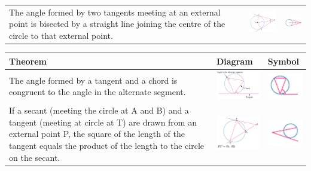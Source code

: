 \documentclass[a4paper,10pt]{report}
\begin{document}
\begin{center}
\begin{tabular}[center]{p{5cm}|p{3cm}|p{2cm}}
		The angle formed by two tangents meeting at an external point is bisected by a straight line joining the centre of the circle to that external point.                                          & \includegraphics[width=3cm]{circle theorem 10} & \includegraphics[width=2cm]{circle theorem 10 symbol} \\
	\end{tabular}
	\begin{tabular}[center]{p{5cm}|p{3cm}|p{2cm}}
		Theorem                                                                                                                                                                                                                      & Diagram                                        & Symbol                                                \\ \hline
		The angle formed by a tangent and a chord is congruent to the angle in the alternate segment.                                                                                                                                & \includegraphics[width=3cm]{circle theorem 11} & \includegraphics[width=2cm]{circle theorem 11 symbol} \\
		If a secant (meeting the circle at A and B) and a tangent (meeting at circle at T) are drawn from an external point P, the square of the length of the tangent equals the product of the length to the circle on the secant. & \includegraphics[width=3cm]{circle theorem 12} & \includegraphics[width=2cm]{circle theorem 12 symbol} \\

\end{tabular}
\end{center}
\end{document}
